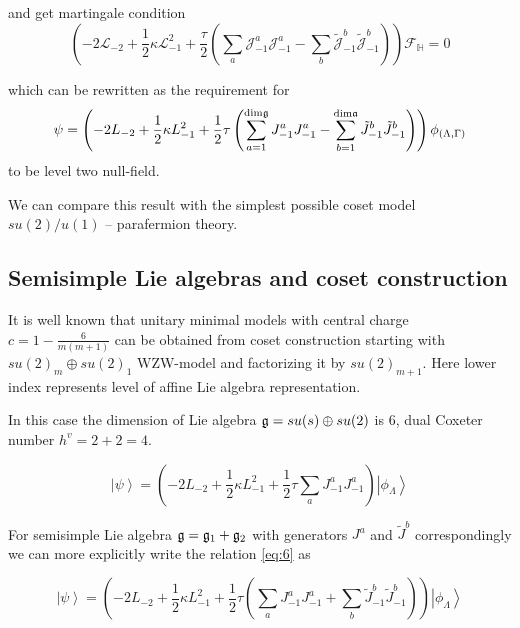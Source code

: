 and get martingale condition
\begin{equation*}
  \left(-2 \mathcal{L}_{-2}+\frac{1}{2}\kappa \mathcal{L}_{-1}^{2}+\frac{\tau}{2}\left( \sum_{a} \mathcal{J}^{a}_{-1} \mathcal{J}^{a}_{-1}-
      \sum_{b}\tilde{\mathcal{J}}^{b}_{-1} \tilde{\mathcal{J}}^{b}_{-1}\right)\right)        \mathcal{F}_{\mathbb{H}}=0
\end{equation*}

which can be rewritten as the requirement for
\begin{equation*}
  \psi=\left(-2L_{-2}+\frac{1}{2}\kappa L_{-1}^{2}+\frac{1}{2}\tau \left(\sum_{a=1}^{\mathrm{dim}\mathfrak{g}}J^{a}_{-1}J^{a}_{-1}-\sum_{b=1}^{\mathrm{dim}\mathfrak{a}}\tilde{J}^{b}_{-1}\tilde{J}^{b}_{-1}\right)\right) \phi_{(\Lambda,\Gamma)}
\end{equation*}
to be level two null-field.

We can compare this result with the simplest possible coset model $su(2)/u(1)$ --  parafermion theory.

\subsection{Semisimple Lie algebras and coset construction}
\label{sec:semis-lie-algebr}

It is well known that unitary minimal models with central charge $c=1-\frac{6}{m(m+1)}$ can be obtained from coset construction starting with $su(2)_{m}\oplus su(2)_{1}$ WZW-model and factorizing it by $su(2)_{m+1}$. Here lower index represents level of affine Lie algebra representation. 

In this case the dimension of Lie algebra $\mathfrak{g}=su(s)\oplus su(2)$ is 6, dual Coxeter number $h^{v}=2+2=4$. 


\begin{equation}
  \left| \psi\right>=\left(-2 L_{-2}+\frac{1}{2}\kappa L_{-1}^{2}+\frac{1}{2}\tau\sum_{a} J^{a}_{-1} J^{a}_{-1}\right) \left|\phi_{\Lambda}\right>    
\label{eq:6}
\end{equation}

For semisimple Lie algebra $\mathfrak{g}=\mathfrak{g}_{1}+\mathfrak{g}_{2}$ with generators $J^{a}$ and $\tilde{J}^{b}$ correspondingly we can more explicitly write the relation \eqref{eq:6} as 

\begin{equation*}
  \left| \psi\right>=\left(-2 L_{-2}+\frac{1}{2}\kappa L_{-1}^{2}+\frac{1}{2}\tau\left(\sum_{a} J^{a}_{-1} J^{a}_{-1}+\sum_{b}\tilde{J}^{b}_{-1}\tilde{J}^{b}_{-1}\right) \right) \left|\phi_{\Lambda}\right>    
\end{equation*}

